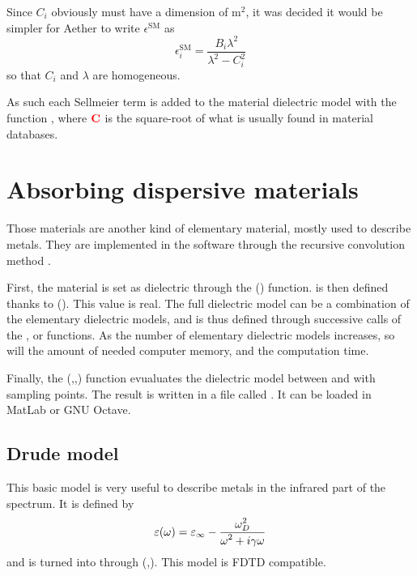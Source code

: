 Since $C_i$ obviously must have a dimension of m$^2$, it was decided it would be simpler for Aether to write $\epsilon^\textrm{SM}$ as
\begin{equation}
	\epsilon^\textrm{SM}_i=\frac{B_i \lambda^2}{\lambda^2-C_i^2}
\end{equation}
so that $C_i$ and $\lambda$ are homogeneous.

As such each Sellmeier term is added to the material dielectric model with the function , where $\textbf{\textcolor{red}{C}}$ is the square-root of what is usually found in material databases.

\section{Absorbing dispersive materials}

	Those materials are another kind of elementary material, mostly used to describe metals. They are implemented in the software through the recursive convolution method \cite{Luebbers:90}.
	
	First, the material is set as dielectric through the () function. \lft{$\varepsilon_\infty$} is then defined thanks to (\lft{$\varepsilon_\infty$}). This value is real. The full dielectric model can be a combination of the elementary dielectric models, and is thus defined through successive calls of the ,  or  functions. As the number of elementary dielectric models increases, so will the amount of needed computer memory, and the computation time.
	
	Finally, the (,,) function evualuates the dielectric model between  and  with  sampling points. The result is written in a file called . It can be loaded in MatLab or GNU Octave.

\subsection{Drude model}

This basic model is very useful to describe metals in the infrared part of the spectrum. It is defined by
\begin{equation}
\varepsilon(\omega)=\varepsilon_\infty-\frac{\displaystyle \omega_D^2}{\displaystyle \omega^2+i\gamma\omega}
\end{equation}
and is turned into through (,\lft{$\gamma$}). This model is FDTD compatible.

